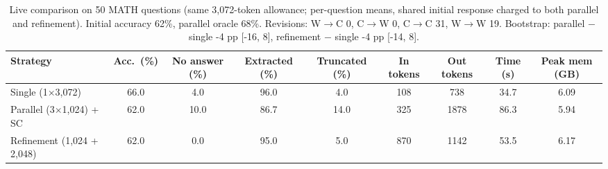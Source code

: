 \begin{table}[t]
\centering
\small
\caption{Live comparison on 50 MATH questions (same 3{,}072-token allowance; per-question means, shared initial response charged to both parallel and refinement). Initial accuracy 62\%, parallel oracle 68\%. Revisions: W$\to$C 0, C$\to$W 0, C$\to$C 31, W$\to$W 19. Bootstrap: parallel $-$ single -4 pp [-16, 8], refinement $-$ single -4 pp [-14, 8].}
\label{tab:t3-live}
\begin{adjustbox}{max width=\linewidth}
\begin{tabular}{lcccccccc}
\toprule
Strategy & Acc.\ (\%) & No answer (\%) & Extracted (\%) & Truncated (\%) & In tokens & Out tokens & Time (s) & Peak mem (GB) \\
\midrule
Single (1$\times$3{,}072) & 66.0 & 4.0 & 96.0 & 4.0 & 108 & 738 & 34.7 & 6.09 \\
Parallel (3$\times$1{,}024) + SC & 62.0 & 10.0 & 86.7 & 14.0 & 325 & 1878 & 86.3 & 5.94 \\
Refinement (1{,}024 + 2{,}048) & 62.0 & 0.0 & 95.0 & 5.0 & 870 & 1142 & 53.5 & 6.17 \\
\bottomrule
\end{tabular}
\end{adjustbox}
\end{table}
